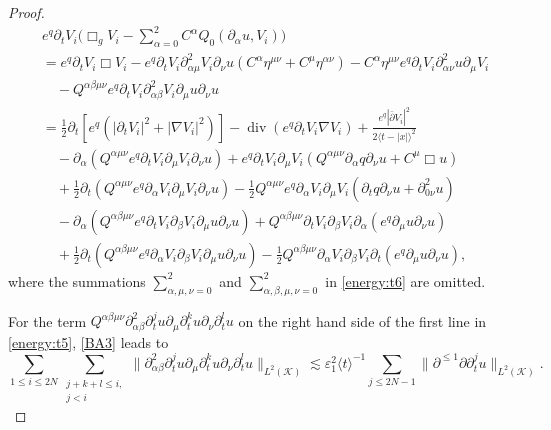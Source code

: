 \documentclass[11pt,twoside]{article}
\def\cK{\mathcal K}
\def\ds{\displaystyle}
\def\p{\partial}
\def\ve{\varepsilon}
\def\dive{\operatorname{div}}
\def\ls{\lesssim}
\newcommand{\w}[1]{\langle {#1} \rangle}
\theoremstyle{plain}
\theoremstyle{definition}
\numberwithin{equation}{section}
\begin{document}
\begin{proof}
\begin{equation}\label{energy:t6}
\begin{split}
&e^q\p_tV_i\Big(\Box_gV_i-\sum_{\alpha=0}^2C^{\alpha}Q_0(\p_{\alpha}u,V_i)\Big)\\
&=e^q\p_tV_i\Box V_i-e^q\p_tV_i\p^2_{\alpha\mu}V_i\p_{\nu}u(C^{\alpha}\eta^{\mu\nu}+C^{\mu}\eta^{\alpha\nu})
-C^{\alpha}\eta^{\mu\nu}e^q\p_tV_i\p^2_{\alpha\nu}u\p_{\mu}V_i\\
&\quad-Q^{\alpha\beta\mu\nu}e^q\p_tV_i\p^2_{\alpha\beta}V_i\p_{\mu}u\p_{\nu}u\\
&=\frac12\p_t[e^q(|\p_tV_i|^2+|\nabla V_i|^2)]-\dive(e^q\p_tV_i\nabla V_i)+\frac{e^q|\bar\p V_i|^2}{2\w{t-|x|}^2}\\
&\quad-\p_{\alpha}(Q^{\alpha\mu\nu}e^q\p_tV_i\p_{\mu}V_i\p_{\nu}u)
+e^q\p_tV_i\p_{\mu}V_i(Q^{\alpha\mu\nu}\p_{\alpha}q\p_{\nu}u+C^{\mu}\Box u)\\
&\quad+\frac12\p_t(Q^{\alpha\mu\nu}e^q\p_{\alpha}V_i\p_{\mu}V_i\p_{\nu}u)
-\frac12Q^{\alpha\mu\nu}e^q\p_{\alpha}V_i\p_{\mu}V_i(\p_tq\p_{\nu}u+\p^2_{0\nu}u)\\
&\quad-\p_{\alpha}(Q^{\alpha\beta\mu\nu}e^q\p_tV_i\p_{\beta}V_i\p_{\mu}u\p_{\nu}u)
+Q^{\alpha\beta\mu\nu}\p_tV_i\p_{\beta}V_i\p_{\alpha}(e^q\p_{\mu}u\p_{\nu}u)\\
&\quad+\frac12\p_t(Q^{\alpha\beta\mu\nu}e^q\p_{\alpha}V_i\p_{\beta}V_i\p_{\mu}u\p_{\nu}u)
-\frac12Q^{\alpha\beta\mu\nu}\p_{\alpha}V_i\p_{\beta}V_i\p_t(e^q\p_{\mu}u\p_{\nu}u),
\end{split}
\end{equation}
where the summations $\ds\sum_{\alpha,\mu,\nu=0}^2$ and $\ds\sum_{\alpha,\beta,\mu,\nu=0}^2$ in \eqref{energy:t6}
are omitted.

For the term $Q^{\alpha\beta\mu\nu}\p^2_{\alpha\beta}\p_t^ju\p_{\mu}\p_t^ku\p_{\nu}\p_t^lu$ on the right hand side of the first line in \eqref{energy:t5},
\eqref{BA3} leads to
\begin{equation}\label{energy:t7}
\sum_{1\le i\le2N}\sum_{\substack{j+k+l\le i,\\j<i}}\|\p^2_{\alpha\beta}\p_t^ju\p_{\mu}\p_t^ku\p_{\nu}\p_t^lu\|_{L^2(\cK)}
\ls\ve_1^2\w{t}^{-1}\sum_{j\le2N-1}\|\p^{\le1}\p\p_t^ju\|_{L^2(\cK)}.
\end{equation}


\end{proof}
\end{document}
